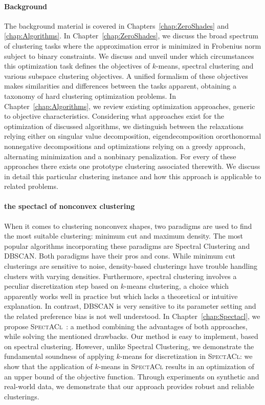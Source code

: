 \paragraph{Background} The background material is covered in Chapters~\ref{chap:ZeroShades} and \ref{chap:Algorithms}. In Chapter~\ref{chap:ZeroShades}, we discuss the broad spectrum of clustering tasks where the approximation error is minimized in Frobenius norm subject to binary constraints. We discuss and unveil under which circumstances this optimization task defines the objectives of $k$-means, spectral clustering and various subspace clustering objectives. A unified formalism of these objectives makes similarities and differences between the tasks apparent, obtaining a taxonomy of hard clustering optimization problems.
In Chapter~\ref{chap:Algorithms}, we review existing optimization approaches, generic to objective characteristics. Considering what approaches exist for the optimization of discussed algorithms, we distinguish between the relaxations relying either on singular value decomposition, eigendecomposition ororthonormal nonnegative decompositions and optimizations relying on a greedy approach, alternating minimization and a nonbinary penalization.  For every of these approaches there exists one prototype clustering associated therewith. We discuss in detail this particular clustering instance and how this approach is applicable to related problems.
\paragraph{the spectacl of nonconvex clustering} 
When it comes to clustering nonconvex shapes, two paradigms are used to find the most suitable clustering: minimum cut and maximum density. The most popular algorithms incorporating these paradigms are Spectral Clustering and DBSCAN. Both paradigms have their pros and cons. While minimum cut clusterings are sensitive to noise, density-based clusterings have trouble handling clusters with varying densities. Furthermore, spectral clustering involves a peculiar discretization step based on $k$-means clustering, a choice which apparently works well in practice but which lacks a theoretical or intuitive explanation. In contrast, DBSCAN is very sensitive to its parameter setting and the related preference bias is not well understood. In Chapter~\ref{chap:Spectacl}, we propose \textsc{SpectACl}~\citep{hess2019spectacl}: a method combining the advantages of both approaches, while solving the mentioned drawbacks. Our method is easy to implement, based on spectral clustering. However, unlike Spectral Clustering, we demonstrate the fundamental soundness of applying $k$-means for discretization in \textsc{SpectACl}: we show that the application of $k$-means in \textsc{SpectACl} results in an optimization of an upper bound of the objective function. Through experiments on synthetic and real-world data, we demonstrate that our approach provides robust and reliable clusterings. 
